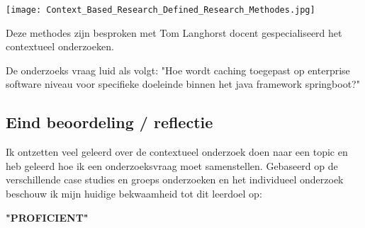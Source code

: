 \texttt{[image: Context\_Based\_Research\_Defined\_Research\_Methodes.jpg]}\label{fig:research_methodes}

Deze methodes zijn besproken met Tom Langhorst docent gespecialiseerd het contextueel onderzoeken.

De onderzoeks vraag luid als volgt: "Hoe wordt caching toegepast op enterprise software niveau voor specifieke doeleinde binnen het java framework springboot?"

\subsection{Eind beoordeling / reflectie}
Ik ontzetten veel geleerd over de contextueel onderzoek doen naar een topic en heb geleerd hoe ik een onderzoeksvraag moet samenstellen.
Gebaseerd op de verschillende case studies en groeps onderzoeken en het individueel onderzoek beschouw ik mijn huidige bekwaamheid tot dit leerdoel op:\\
\par\vspace{10pt}\textbf{\uppercase{"Proficient"}}\\


\newpage
